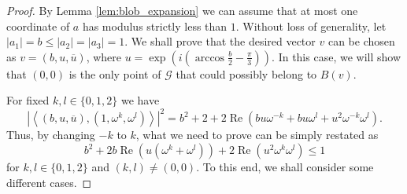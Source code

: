 \documentclass[10pt,a4paper]{amsart}
\DeclareMathOperator{\re}{Re}
\begin{document}
\begin{proof}


By Lemma \ref{lem:blob_expansion} we can assume that at most one coordinate of $a$ has modulus strictly less than $1$. Without loss of generality, let $|a_1|=b \leq |a_2|=|a_3|=1$. We shall prove that the desired vector $v$ can be chosen as $v=(b, u, \overline{u})$, where $u=\exp{\left (i\left ( \arccos{\frac{b}{2}} - \frac{\pi}{3} \right ) \right )}$. In this case, we will show that $(0, 0)$ is the only point of $\mathcal{G}$ that could possibly belong to $B(v)$.

For fixed $k, l \in \{0, 1, 2\}$ we have
$$\left | \left \langle (b, u, \overline{u}), (1, \omega^k, \omega^l) \right \rangle \right |^2 = b^2 + 2 + 2 \re\left ( b u \omega^{-k} + b u \omega^{l} + u^2 \omega^{-k} \omega^{l} \right ).$$
Thus, by changing $-k$ to $k$, what we need to prove can be simply restated as
\begin{equation}
\label{desiredineq}
b^2 + 2b \re \left (u \left ( \omega^{k} + \omega^{l} \right ) \right ) + 2 \re \left (u^2\omega^k\omega^l \right ) \leq 1
\end{equation}
for $k, l \in \{0, 1, 2\}$ and $(k, l) \neq (0, 0)$. To this end, we shall consider some different cases.


\end{proof}
\end{document}
